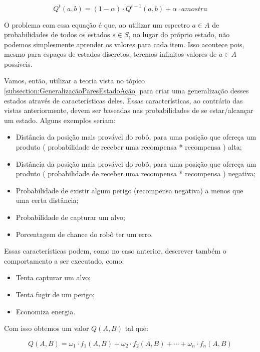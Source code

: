 \begin{equation}
	Q^t \left( a, b \right) = \left( 1 - \alpha \right) \cdot Q^{t-1} \left( a, b \right) + \alpha \cdot amostra
\end{equation}

O problema com essa equação é que, ao utilizar um espectro $ a \in A $ de probabilidades de todos os estados $ s \in S $, no lugar do próprio estado, não podemos simplesmente aprender os valores para cada item. Isso acontece pois, mesmo para espaços de estados discretos, teremos infinitos valores de $ a \in A $ possíveis.

Vamos, então, utilizar a teoria vista no tópico \ref{subsection:GeneralizaçãoParesEstadoAção} para criar uma generalização desses estados através de características deles. Essas características, ao contrário das vistas anteriormente, devem ser baseadas nas probabilidades de se estar/alcançar um estado. Alguns exemplos seriam:

\begin{itemize}
	\item Distância da posição mais provável do robô, para uma posição que ofereça um produto ( probabilidade de receber uma recompensa * recompensa ) alta;
	\item Distância da posição mais provável do robô, para uma posição que ofereça um produto ( probabilidade de receber uma recompensa * recompensa ) negativa;
	\item Probabilidade de existir algum perigo (recompensa negativa) a menos que uma certa distância;
	\item Probabilidade de capturar um alvo;
	\item Porcentagem de chance do robô ter um erro.
\end{itemize}

Essas características podem, como no caso anterior, descrever também o comportamento a ser executado, como:

\begin{itemize}
	\item Tenta capturar um alvo;
	\item Tenta fugir de um perigo;
	\item Economiza energia.
\end{itemize}

Com isso obtemos um valor $ Q \left( A, B \right) $ tal que:

\begin{equation}
	Q \left( A, B \right) = \omega_1 \cdot f_1 \left( A, B \right) + \omega_2 \cdot f_2 \left( A, B \right) + \cdots + \omega_n \cdot f_n \left( A, B \right)
\end{equation}


